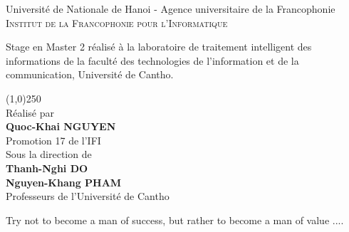 \clearpage
\thispagestyle{empty}

\begin{center}
\huge{Université de Nationale de Hanoi - Agence universitaire de la Francophonie}\\[0.5cm]
\normalsize
\textsc{Institut de la Francophonie pour l'Informatique}\\[2.0cm]
\end{center}

\normalsize Stage en Master 2 réalisé à la laboratoire de traitement intelligent des informations de la faculté des technologies de l'information et de la communication, Université de Cantho.\\[1.0cm]


\begin{flushright}
\line(1,0){250} \\
Réalisé par \\
\textbf{Quoc-Khai NGUYEN}\\
Promotion 17 de l'IFI\\[1.5cm]

Sous la direction de \\
{\textbf{Thanh-Nghi DO}}\\
{\textbf{Nguyen-Khang PHAM}}\\
Professeurs de l'Université de Cantho \\[0.5cm]

\end{flushright}


\clearpage
\thispagestyle{empty}
\begin{large}
Try not to become a man of success, but rather to become a man of value ....
\end{large}
